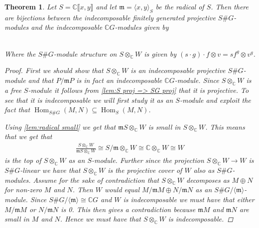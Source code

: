 \documentclass[11pt, a4paper, english]{article}
\numberwithin{prop}{section}
\numberwithin{lemma}{section}
\newtheorem{theorem}{Theorem}
\numberwithin{theorem}{section}
\numberwithin{defin}{section}
\numberwithin{example}{section}
\newcommand{\C}{\mathbb{C}}
\DeclareMathOperator{\Hom}{Hom}
\begin{document}
\begin{theorem}
\label{thm:indec_proj_SG=indec_CG}
Let $S = \C\llbracket x, y \rrbracket$ and let $\mathfrak{m} = \langle x, y \rangle_S$ be the radical of $S$. Then there are bijections between the indecomposable finitely generated projective $S\#G$-modules and the indecomposable $\C G$-modules given by
\\
\\

Where the $S\#G$-module structure on $S \otimes_\C W$ is given by $(s \cdot g) \cdot f \otimes v = sf^g \otimes v^g$.

\begin{proof}
First we should show that $S \otimes_\C W$ is an indecomposable projective $S\#G$-module and that $P/\mathfrak{m}P$ is in fact an indecomposable $\C G$-module. Since $S \otimes_\C W$ is a free $S$-module it follows from \cref{lem:S proj => SG proj} that it is projective. To see that it is indecomposable we will first study it as an $S$-module and exploit the fact that $\Hom_{S\#G}(M,N) \subseteq \Hom_S(M,N)$. 

Using \cref{lem:radical small} we get that $\mathfrak{m}S \otimes_\C W$ is small in $S\otimes_\C W$. This means that we get that 
\begin{align*}
\frac{S \otimes_\C W}{\mathfrak{m}S \otimes_\C W} \cong S/\mathfrak{m} \otimes_\C W \cong \C \otimes_\C W \cong W
\end{align*}
is the top of $S \otimes_\C W$ as an $S$-module. Further since the projection $S \otimes_\C W \to W$ is $S\#G$-linear we have that $S \otimes_\C W$ is the projective cover of $W$ also as $S\#G$-modules. Assume for the sake of contradiction that $S \otimes_\C W$ decomposes as $M \oplus N$ for non-zero $M$ and $N$. Then $W$ would equal $M/\mathfrak{m}M \oplus N/\mathfrak{m}N$ as an $S\#G/ \langle \mathfrak{m} \rangle$-module. Since $S\#G/ \langle \mathfrak{m} \rangle \cong \C G$ and $W$ is indecomposable we must have that either $M/\mathfrak{m}M$ or $N/\mathfrak{m}N$ is 0. This then gives a contradiction because $\mathfrak{m}M$ and $\mathfrak{m}N$ are small in $M$ and $N$. Hence we must have that $S \otimes_\C W$ is indecomposable.


\end{proof}
\end{theorem}
\end{document}
